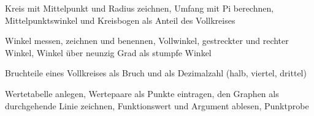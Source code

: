 \begin{aufgabe}{Kreis mit Mittelpunkt und Radius zeichnen, Umfang mit Pi berechnen, Mittelpunktswinkel und Kreisbogen als Anteil des Vollkreises}
\end{aufgabe}

\begin{aufgabe}{Winkel messen, zeichnen und benennen, Vollwinkel, gestreckter und rechter Winkel, Winkel über neunzig Grad als stumpfe Winkel}
\end{aufgabe}

\begin{aufgabe}{Bruchteile eines Vollkreises als Bruch und als Dezimalzahl (halb, viertel, drittel)}
\end{aufgabe}

\begin{aufgabe}{Wertetabelle anlegen, Wertepaare als Punkte eintragen, den Graphen als durchgehende Linie zeichnen, Funktionswert und Argument ablesen, Punktprobe}
\end{aufgabe}

